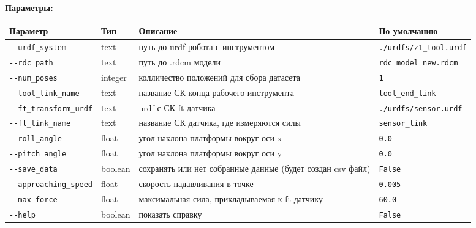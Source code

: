 \textbf{Параметры:}
\begin{center}
\fontsize{10pt}{10pt}\selectfont
\begin{longtable}[]{p{5cm}|p{2cm}|p{3.5cm}|p{5cm}}
    \hline
\toprule()
Параметр & Тип & Описание & По умолчанию \\
\hline
\midrule()
\endhead
\texttt{-\/-urdf\_system} & text & путь до urdf робота с инструментом
&
\texttt{./urdfs/z1\_tool.urdf} \\
\hline
\texttt{-\/-rdc\_path} & text & путь до .rdcm модели &
\texttt{rdc\_model\_new.rdcm} \\
\hline
\texttt{-\/-num\_poses} & integer & колличество положений для сбора датасета &
\texttt{1} \\
\hline
\texttt{-\/-tool\_link\_name} & text & название СК конца рабочего инструмента &
\texttt{tool\_end\_link} \\
\hline
\texttt{-\/-ft\_transform\_urdf} & text & urdf с СК ft датчика &
\texttt{./urdfs/sensor.urdf} \\
\hline
\texttt{-\/-ft\_link\_name} & text & название СК датчика, где измеряются силы &
\texttt{sensor\_link} \\
\hline
\texttt{-\/-roll\_angle} & float & угол наклона платформы вокруг оси x & \texttt{0.0} \\
\hline
\texttt{-\/-pitch\_angle} & float & угол наклона платформы вокруг оси y & \texttt{0.0} \\
\hline
\texttt{-\/-save\_data} & boolean & сохранять или нет собранные данные (будет создан csv файл) & \texttt{False} \\
\hline
\texttt{-\/-approaching\_speed} & float & скорость надавливания в точке & \texttt{0.005} \\
\hline
\texttt{-\/-max\_force} & float & максимальная сила, прикладываемая к ft датчику &
\texttt{60.0} \\
\hline
\texttt{-\/-help} & boolean & показать справку &
\texttt{False} \\
\bottomrule()
\hline
\end{longtable}
\end{center}